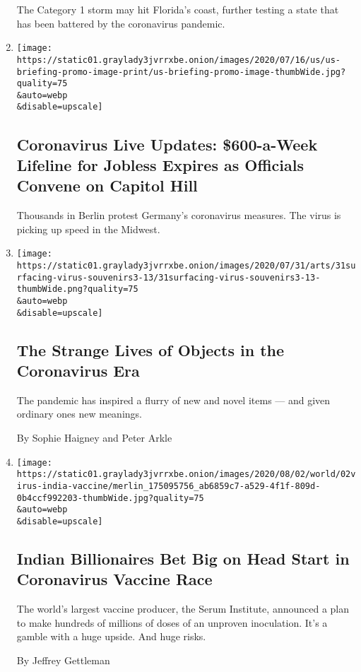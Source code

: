 \begin{enumerate}
  The Category 1 storm may hit Florida's coast, further testing a state
  that has been battered by the coronavirus pandemic.
\item
  \href{/2020/08/01/world/coronavirus-covid-19.html}{}

  \texttt{[image: https://static01.graylady3jvrrxbe.onion/images/2020/07/16/us/us-briefing-promo-image-print/us-briefing-promo-image-thumbWide.jpg?quality=75\\\&auto=webp\\\&disable=upscale]}

  \hypertarget{coronavirus-live-updates-600-a-week-lifeline-for-jobless-expires-as-officials-convene-on-capitol-hill}{%
  \subsection{Coronavirus Live Updates: \$600-a-Week Lifeline for
  Jobless Expires as Officials Convene on Capitol
  Hill}\label{coronavirus-live-updates-600-a-week-lifeline-for-jobless-expires-as-officials-convene-on-capitol-hill}}

  Thousands in Berlin protest Germany's coronavirus measures. The virus
  is picking up speed in the Midwest.
\item
  \href{/2020/08/01/arts/design/virus-design-objects.html}{}

  \texttt{[image: https://static01.graylady3jvrrxbe.onion/images/2020/07/31/arts/31surfacing-virus-souvenirs3-13/31surfacing-virus-souvenirs3-13-thumbWide.png?quality=75\\\&auto=webp\\\&disable=upscale]}

  \hypertarget{the-strange-lives-of-objects-in-the-coronavirus-era}{%
  \subsection{The Strange Lives of Objects in the Coronavirus
  Era}\label{the-strange-lives-of-objects-in-the-coronavirus-era}}

  The pandemic has inspired a flurry of new and novel items --- and
  given ordinary ones new meanings.

  By Sophie Haigney and Peter Arkle
\item
  \href{/2020/08/01/world/asia/coronavirus-vaccine-india.html}{}

  \texttt{[image: https://static01.graylady3jvrrxbe.onion/images/2020/08/02/world/02virus-india-vaccine/merlin\_175095756\_ab6859c7-a529-4f1f-809d-0b4ccf992203-thumbWide.jpg?quality=75\\\&auto=webp\\\&disable=upscale]}

  \hypertarget{indian-billionaires-bet-big-on-head-start-in-coronavirus-vaccine-race}{%
  \subsection{Indian Billionaires Bet Big on Head Start in Coronavirus
  Vaccine
  Race}\label{indian-billionaires-bet-big-on-head-start-in-coronavirus-vaccine-race}}

  The world's largest vaccine producer, the Serum Institute, announced a
  plan to make hundreds of millions of doses of an unproven inoculation.
  It's a gamble with a huge upside. And huge risks.

  By Jeffrey Gettleman
\end{enumerate}

